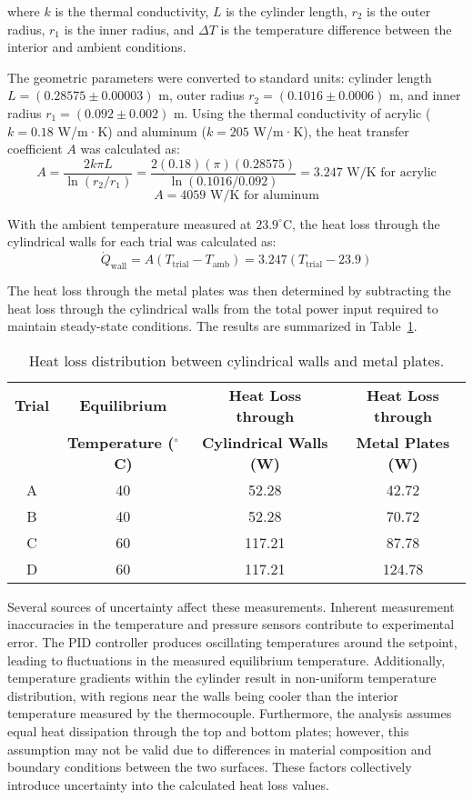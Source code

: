 \documentclass[12pt]{article}
\begin{document}
where \(k\) is the thermal conductivity, \(L\) is the cylinder length, \(r_2\) is the outer radius, \(r_1\) is the inner radius, and \(\Delta T\) is the temperature difference between the interior and ambient conditions.

The geometric parameters were converted to standard units: cylinder length \(L = (0.28575 \pm 0.00003)\) m, outer radius \(r_2 = (0.1016 \pm 0.0006)\) m, and inner radius \(r_1 = (0.092 \pm 0.002)\) m. Using the thermal conductivity of acrylic (\(k = 0.18\) W/m·K) and aluminum (\(k = 205\) W/m·K), the heat transfer coefficient \(A\) was calculated as:
\[
A = \frac{2k\pi L}{\ln(r_2/r_1)} = \frac{2(0.18)(\pi)(0.28575)}{\ln(0.1016/0.092)} = 3.247 \text{ W/K for acrylic}
\]
\[
A = 4059 \text{ W/K for aluminum}
\]

With the ambient temperature measured at \(23.9^{\circ}\)C, the heat loss through the cylindrical walls for each trial was calculated as:
\[
\dot{Q}_{\text{wall}} = A(T_{\text{trial}} - T_{\text{amb}}) = 3.247(T_{\text{trial}} - 23.9)
\]

The heat loss through the metal plates was then determined by subtracting the heat loss through the cylindrical walls from the total power input required to maintain steady-state conditions. The results are summarized in Table~\ref{tab:plateloss}.

\begin{table}[h!]
\centering
\caption{Heat loss distribution between cylindrical walls and metal plates.}
\label{tab:plateloss}
\begin{tabular}{@{}cccc@{}}
\toprule
\textbf{Trial} & \textbf{Equilibrium} & \textbf{Heat Loss through} & \textbf{Heat Loss through} \\
& \textbf{Temperature ($^{\circ}$C)} & \textbf{Cylindrical Walls (W)} & \textbf{Metal Plates (W)} \\
\midrule
A & 40 & 52.28 & 42.72 \\
B & 40 & 52.28 & 70.72 \\
C & 60 & 117.21 & 87.78 \\
D & 60 & 117.21 & 124.78 \\
\bottomrule
\end{tabular}
\end{table}

Several sources of uncertainty affect these measurements. Inherent measurement inaccuracies in the temperature and pressure sensors contribute to experimental error. The PID controller produces oscillating temperatures around the setpoint, leading to fluctuations in the measured equilibrium temperature. Additionally, temperature gradients within the cylinder result in non-uniform temperature distribution, with regions near the walls being cooler than the interior temperature measured by the thermocouple. Furthermore, the analysis assumes equal heat dissipation through the top and bottom plates; however, this assumption may not be valid due to differences in material composition and boundary conditions between the two surfaces. These factors collectively introduce uncertainty into the calculated heat loss values.
\end{document}
